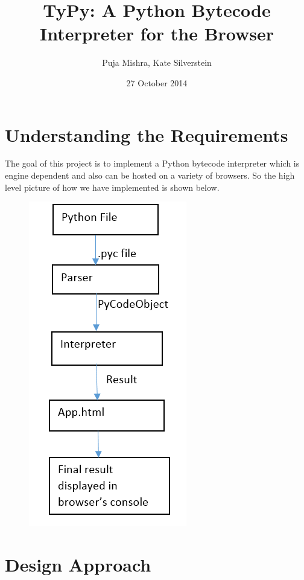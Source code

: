 \documentclass[10pt,a4paper]{article}
\title{TyPy: A Python Bytecode Interpreter for the Browser}
\author{Puja Mishra, Kate Silverstein}
\date{27 October 2014}
\begin{document}
\maketitle
\section{Understanding the Requirements}

The goal of this project is to implement a Python bytecode interpreter which is engine dependent and also can be hosted on a variety of browsers. So the high level picture of how we have implemented is shown below.

\begin{figure}[ht!]
\center
\includegraphics[scale=1]{../Report/UnderstandingTheReq.png} 

\end{figure}

\section{Design Approach}
\end{document}
